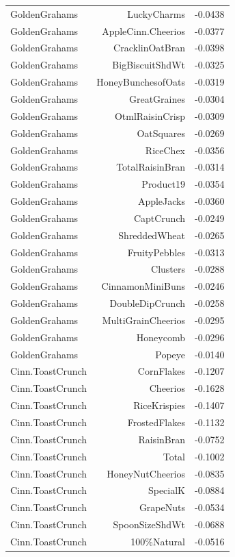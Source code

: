 \begin{longtable}{@{}lrr@{}}
GoldenGrahams & LuckyCharms & -0.0438 \\
GoldenGrahams & AppleCinn.Cheerios & -0.0377 \\
GoldenGrahams & CracklinOatBran & -0.0398 \\
GoldenGrahams & BigBiscuitShdWt & -0.0325 \\
GoldenGrahams & HoneyBunchesofOats & -0.0319 \\
GoldenGrahams & GreatGraines & -0.0304 \\
GoldenGrahams & OtmlRaisinCrisp & -0.0309 \\
GoldenGrahams & OatSquares & -0.0269 \\
GoldenGrahams & RiceChex & -0.0356 \\
GoldenGrahams & TotalRaisinBran & -0.0314 \\
GoldenGrahams & Product19 & -0.0354 \\
GoldenGrahams & AppleJacks & -0.0360 \\
GoldenGrahams & CaptCrunch & -0.0249 \\
GoldenGrahams & ShreddedWheat & -0.0265 \\
GoldenGrahams & FruityPebbles & -0.0313 \\
GoldenGrahams & Clusters & -0.0288 \\
GoldenGrahams & CinnamonMiniBuns & -0.0246 \\
GoldenGrahams & DoubleDipCrunch & -0.0258 \\
GoldenGrahams & MultiGrainCheerios & -0.0295 \\
GoldenGrahams & Honeycomb & -0.0296 \\
GoldenGrahams & Popeye & -0.0140 \\
Cinn.ToastCrunch & CornFlakes & -0.1207 \\
Cinn.ToastCrunch & Cheerios & -0.1628 \\
Cinn.ToastCrunch & RiceKrispies & -0.1407 \\
Cinn.ToastCrunch & FrostedFlakes & -0.1132 \\
Cinn.ToastCrunch & RaisinBran & -0.0752 \\
Cinn.ToastCrunch & Total & -0.1002 \\
Cinn.ToastCrunch & HoneyNutCheerios & -0.0835 \\
Cinn.ToastCrunch & SpecialK & -0.0884 \\
Cinn.ToastCrunch & GrapeNuts & -0.0534 \\
Cinn.ToastCrunch & SpoonSizeShdWt & -0.0688 \\
Cinn.ToastCrunch & 100\%Natural & -0.0516 \\

\end{longtable}
